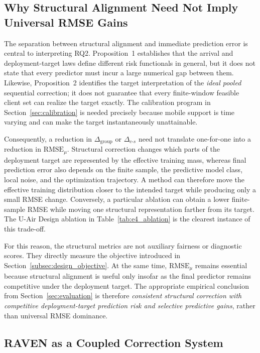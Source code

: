 \documentclass[letterpaper,journal]{IEEEtran}
\begin{document}
\subsection{Why Structural Alignment Need Not Imply Universal RMSE Gains}
\label{subsec:discussion_alignment_rmse}

The separation between structural alignment and immediate prediction error is
central to interpreting RQ2.  Proposition~1 establishes that the arrival and
deployment-target laws define different risk functionals in general, but it
does not state that every predictor must incur a large numerical gap between
them.  Likewise, Proposition~2 identifies the target interpretation of the
\emph{ideal pooled} sequential correction; it does not guarantee that every
finite-window feasible client set can realize the target exactly.  The
calibration program in Section~\ref{sec:calibration} is needed precisely because
mobile support is time varying and can make the target instantaneously
unattainable.

Consequently, a reduction in
$\Delta_{\mathrm{group}}$ or $\Delta_{c\text{-}s}$ need not translate
one-for-one into a reduction in $\mathrm{RMSE}_{\mu}$.  Structural correction
changes which parts of the deployment target are represented by the effective
training mass, whereas final prediction error also depends on the finite sample,
the predictive model class, local noise, and the optimization trajectory.  A
method can therefore move the effective training distribution closer to the
intended target while producing only a small RMSE change.  Conversely, a
particular ablation can obtain a lower finite-sample RMSE while moving one
structural representation farther from its target.  The U-Air Design ablation
in Table~\ref{tab:e4_ablation} is the clearest instance of this trade-off.

For this reason, the structural metrics are not auxiliary fairness or
diagnostic scores.  They directly measure the objective introduced in
Section~\ref{subsec:design_objective}.  At the same time,
$\mathrm{RMSE}_{\mu}$ remains essential because structural alignment is useful
only insofar as the final predictor remains competitive under the deployment
target.  The appropriate empirical conclusion from Section~\ref{sec:evaluation}
is therefore \emph{consistent structural correction with competitive
deployment-target prediction risk and selective predictive gains}, rather than
universal RMSE dominance.

\subsection{RAVEN as a Coupled Correction System}
\label{subsec:discussion_components}
\end{document}
